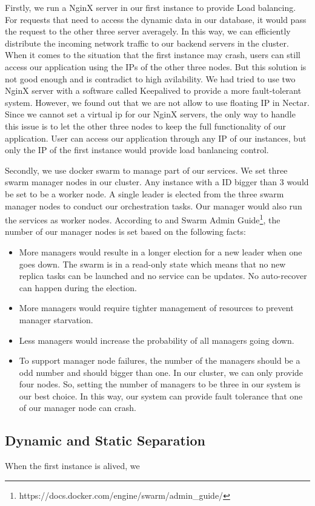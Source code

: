 \documentclass{article}
\begin{document}
Firstly, we run a NginX server in our first instance to provide Load balancing. For requests that need to access the dynamic data in our database, it would pass the request to the other three server averagely. In this way, we can efficiently distribute the incoming network traffic to our backend servers in the cluster. When it comes to the situation that the first instance may crash, users can still access our application using the IPs of the other three nodes. But this solution is not good enough and is contradict to high avilability. We had tried to use two NginX server with a software called Keepalived to provide a more fault-tolerant system. However, we found out that we are not allow to use floating IP in Nectar. Since we cannot set a virtual ip for our NginX servers, the only way to handle this issue is to let the other three nodes to keep the full functionality of our application. User can access our application through any IP of our instances, but only the IP of the first instance would provide load banlancing control. 

Secondly, we use docker swarm to manage part of our services. We set three swarm manager nodes in our cluster. Any instance with a ID bigger than 3 would be set to be a worker node. A single leader is elected from the three swarm manager nodes to conduct our orchestration tasks. Our manager would also run the services as worker nodes. According to \cite{pros-and-cons-of-running-all-docker-swarm-nodes-as-managers} and Swarm Admin Guide\footnote{https://docs.docker.com/engine/swarm/admin\_guide/}, the number of our manager nodes is set based on the following facts:
\begin{itemize}
	\item More managers would resulte in a longer election for a new leader when one goes down. The swarm is in a read-only state which means that no new replica tasks can be launched and no service can be updates. No auto-recover can happen during the election.
	\item More managers would require tighter management of resources to prevent manager starvation.
	\item Less managers would increase the probability of all managers going down.
	\item To support manager node failures, the number of the managers should be a odd number and should bigger than one. In our cluster, we can only provide four nodes. So, setting the number of managers to be three in our system is our best choice. In this way, our system can provide fault tolerance that one of our manager node can crash.
\end{itemize}



\subsection{Dynamic and Static Separation}
When the first instance is alived, we 






\end{document}
